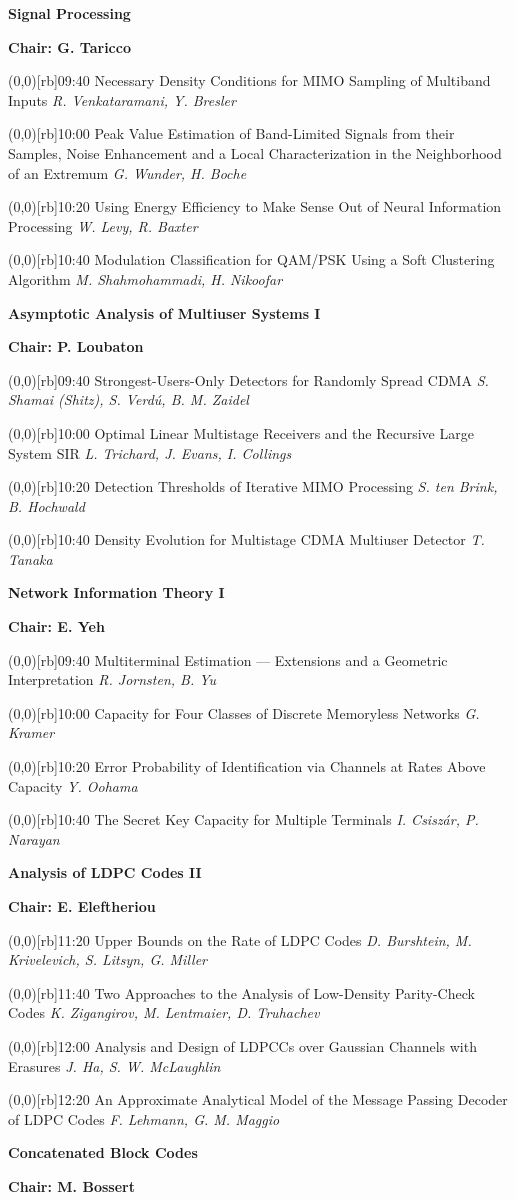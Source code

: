 \documentclass[a5paper,twoside]{article}
\def\period#1{\flushleft{\large\bfseries #1}\markboth{\sf #1}{\sf #1}}
\def\sesstitle#1{\vspace{.45\bigskipamount}\par{\bfseries #1}\par}
\def\sesschair#1{{\bfseries Chair: #1}\par\vspace{.65\medskipamount}}
\def\papertime#1{\makebox(0,0)[rb]{{\scriptsize #1}\hspace{.5em}}}
\def\papertitle#1{#1\hfil\break}
\def\paperauthors#1{{\itshape #1}\par\filbreak\vspace{.65\medskipamount}}
\begin{document}
\sesstitle{Signal Processing}
\sesschair{G. Taricco}
\papertime{09:40}%
\papertitle{Necessary Density Conditions for MIMO Sampling of Multiband Inputs}
\paperauthors{R. Venkataramani, Y. Bresler}
\papertime{10:00}%
\papertitle{Peak Value Estimation of Band-Limited Signals from their Samples, Noise Enhancement and a Local Characterization in the Neighborhood of an Extremum}
\paperauthors{G. Wunder, H. Boche}
\papertime{10:20}%
\papertitle{Using Energy Efficiency to Make Sense Out of Neural Information Processing}
\paperauthors{W. Levy, R. Baxter}
\papertime{10:40}%
\papertitle{Modulation Classification for QAM/PSK Using a Soft Clustering Algorithm}
\paperauthors{M. Shahmohammadi, H. Nikoofar}
\sesstitle{Asymptotic Analysis of Multiuser Systems I}
\sesschair{P. Loubaton}
\papertime{09:40}%
\papertitle{Strongest-Users-Only Detectors for Randomly Spread CDMA}
\paperauthors{S. Shamai (Shitz), S. Verd\'u, B. M. Zaidel}
\papertime{10:00}%
\papertitle{Optimal Linear Multistage Receivers and the Recursive Large System SIR}
\paperauthors{L. Trichard, J. Evans, I. Collings}
\papertime{10:20}%
\papertitle{Detection Thresholds of Iterative MIMO Processing}
\paperauthors{S. ten Brink, B. Hochwald}
\papertime{10:40}%
\papertitle{Density Evolution for Multistage CDMA Multiuser Detector}
\paperauthors{T. Tanaka}
\sesstitle{Network Information Theory I}
\sesschair{E. Yeh}
\papertime{09:40}%
\papertitle{Multiterminal Estimation --- Extensions and a Geometric Interpretation}
\paperauthors{R. Jornsten, B. Yu}
\papertime{10:00}%
\papertitle{Capacity for Four Classes of Discrete Memoryless Networks}
\paperauthors{G. Kramer}
\papertime{10:20}%
\papertitle{Error Probability of Identification via Channels at Rates Above Capacity}
\paperauthors{Y. Oohama}
\papertime{10:40}%
\papertitle{The Secret Key Capacity for Multiple Terminals}
\paperauthors{I. Csisz\'ar, P. Narayan}
\period{Mon 11:20 -- 12:40}
\sesstitle{Analysis of LDPC Codes II}
\sesschair{E. Eleftheriou}
\papertime{11:20}%
\papertitle{Upper Bounds on the Rate of LDPC Codes}
\paperauthors{D. Burshtein, M. Krivelevich, S. Litsyn, G. Miller}
\papertime{11:40}%
\papertitle{Two Approaches to the Analysis of Low-Density Parity-Check Codes}
\paperauthors{K. Zigangirov, M. Lentmaier, D. Truhachev}
\papertime{12:00}%
\papertitle{Analysis and Design of LDPCCs over Gaussian Channels with Erasures}
\paperauthors{J. Ha, S. W. McLaughlin}
\papertime{12:20}%
\papertitle{An Approximate Analytical Model of the Message Passing Decoder of LDPC Codes}
\paperauthors{F. Lehmann, G. M. Maggio}
\sesstitle{Concatenated Block Codes}
\sesschair{M. Bossert}
\end{document}
